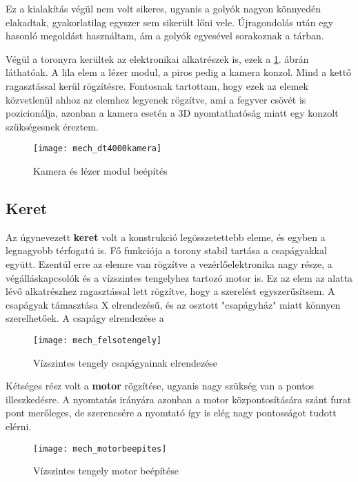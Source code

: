 Ez a kialakítás végül nem volt sikeres, ugyanis a golyók nagyon könnyedén elakadtak, gyakorlatilag egyszer sem sikerült lőni vele. Újragondolás után egy hasonló megoldást használtam, ám a golyók egyesével sorakoznak a tárban.

Végül a toronyra kerültek az elektronikai alkatrészek is, ezek a \ref{fig:mech_dt4000kamera}. ábrán láthatóak. A lila elem a lézer modul, a piros pedig a kamera konzol. Mind a kettő ragasztással kerül rögzítésre. Fontosnak tartottam, hogy ezek az elemek közvetlenül ahhoz az elemhez legyenek rögzítve, ami a fegyver csövét is pozicionálja, azonban a kamera esetén a 3D nyomtathatóság miatt egy konzolt szükségesnek éreztem.

\begin{figure}[h!]
	\centering
	\texttt{[image: mech\_dt4000kamera]}
	\caption{Kamera és lézer modul beépítés}
	\label{fig:mech_dt4000kamera}
\end{figure}

\subsection{Keret}
Az úgynevezett \textbf{keret} volt a konstrukció legösszetettebb eleme, és egyben a legnagyobb térfogatú is. Fő funkciója a torony stabil tartása a csapágyakkal együtt. Ezentúl erre az elemre van rögzítve a vezérlőelektronika nagy része, a végálláskapcsolók és a vízszintes tengelyhez tartozó motor is. Ez az elem az alatta lévő alkatrészhez ragasztással lett rögzítve, hogy a szerelést egyszerűsítsem. A csapágyak támasztása X elrendezésű, és az osztott "csapágyház" miatt könnyen szerelhetőek. A csapágy elrendezése  a

\begin{figure}[h!]
	\centering
	\texttt{[image: mech\_felsotengely]}
	\caption{Vízszintes tengely csapágyainak elrendezése}
	\label{fig:mech_felsotengely}
\end{figure}


Kétséges rész volt a \textbf{motor} rögzítése, ugyanis nagy szükség van a pontos illeszkedésre. A nyomtatás irányára azonban a motor központosítására szánt furat pont merőleges, de szerencsére a nyomtató így is elég nagy pontosságot tudott elérni.

\begin{figure}[h!]
	\centering
	\texttt{[image: mech\_motorbeepites]}
	\caption{Vízszintes tengely motor beépítése}
	\label{fig:mech_motorbeepites}
\end{figure}

